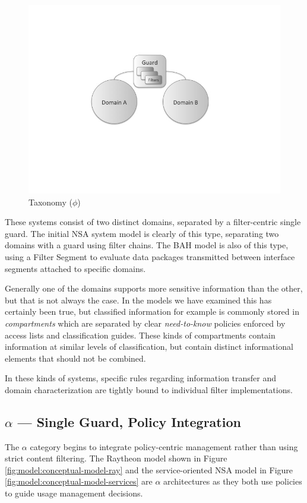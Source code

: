 \documentclass[12pt,letterpaper]{article}
\begin{document}
\begin{figure}[!t]
\centering
\includegraphics[width=5in]{model-phi}
\caption{Taxonomy ($\phi$)}
\label{fig:model:taxonomy-phi}
\end{figure}

These systems consist of two distinct domains, separated by a filter-centric single guard.  The initial NSA system model is clearly of this type, separating two domains with a guard using filter chains.  The BAH model is also of this type, using a Filter Segment to evaluate data packages transmitted between interface segments attached to specific domains.

Generally one of the domains supports more sensitive information than the other, but that is not always the case.  In the models we have examined this has certainly been true, but classified information for example  is commonly stored in \textit{compartments} which are separated by clear \textit{need-to-know} policies enforced by access lists and classification guides.  These kinds of compartments contain information at similar levels of classification, but contain distinct informational elements that should not be combined.

In these kinds of systems, specific rules regarding information transfer and domain characterization are tightly bound to individual filter implementations.

\subsection{$\alpha$ --- Single Guard, Policy Integration}
The $\alpha$ category begins to integrate policy-centric management rather than using strict content filtering.  The Raytheon model shown in Figure \ref{fig:model:conceptual-model-ray} and the service-oriented NSA model in Figure \ref{fig:model:conceptual-model-services} are $\alpha$ architectures as they both use policies to guide usage management decisions.
\end{document}
